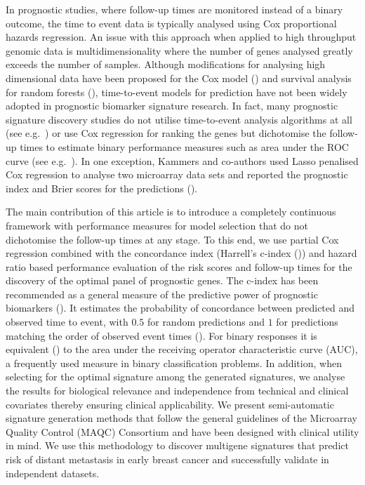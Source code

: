 \documentclass[letterpaper,12pt]{article}
\begin{document}
In prognostic studies, where follow-up times are monitored instead of a binary outcome, the time to event data is typically analysed using Cox proportional hazards regression. An issue with this approach when applied to high throughput genomic data is multidimensionality where the number of genes analysed greatly exceeds the number of samples. Although modifications for analysing high dimensional data have been proposed for the Cox model (\citet{Boulesteix:06, Li:04, Gui:05, Witten:10}) and survival analysis for random forests (\citet{Ishwaran:08}), time-to-event models for prediction have not been widely adopted in prognostic biomarker signature research. In fact, many prognostic signature discovery studies do not utilise time-to-event analysis algorithms at all (see e.g.\ \citet{Schmidt:08}) or use Cox regression for ranking the genes but dichotomise the follow-up times to estimate binary performance measures such as area under the ROC curve (see e.g.\ \citet{Wang:05}). In one exception, Kammers and co-authors used Lasso penalised Cox regression to analyse two microarray data sets and reported the prognostic index and Brier scores for the predictions (\citet{Kammers:11}). 

The main contribution of this article is to introduce a completely continuous framework with performance measures for model selection that do not dichotomise the follow-up times at any stage. To this end, we use partial Cox regression combined with the concordance index (Harrell's c-index (\citet{Harrell:10,Raykar:07})) and hazard ratio based performance evaluation of the risk scores and follow-up times for the discovery of the optimal panel of prognostic genes. The c-index has been recommended as a general measure of the predictive power of prognostic biomarkers (\citet{Newson:06}). It estimates the probability of concordance between predicted and observed time to event, with $0.5$ for random predictions and $1$ for predictions matching the order of observed event times (\citet{Harrell:10}). For binary responses it is equivalent (\citet{Newson:06}) to the area under the receiving operator characteristic curve (AUC), a frequently used measure in binary classification problems. In addition, when selecting for the optimal signature among the generated signatures, we analyse the results for biological relevance and independence from technical and clinical covariates thereby ensuring clinical applicability. We present semi-automatic signature generation methods that follow the general guidelines of the Microarray Quality Control (MAQC) Consortium and have been designed with clinical utility in mind. We use this methodology to discover multigene signatures that predict risk of distant metastasis in early breast cancer and successfully validate in independent datasets.
\end{document}
